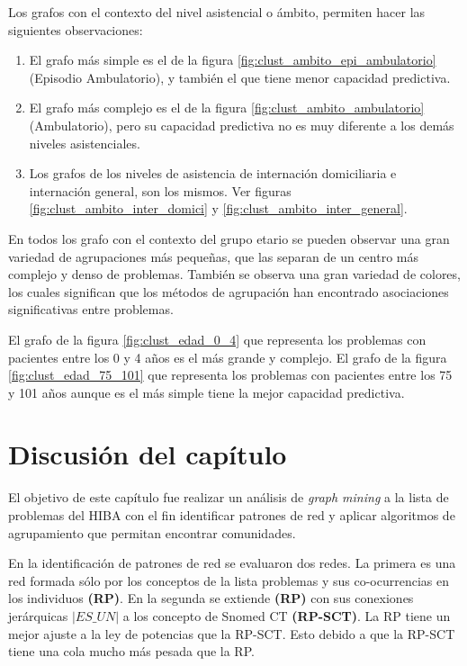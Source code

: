 Los grafos con el contexto del nivel asistencial o ámbito, permiten hacer las siguientes observaciones:

\begin{enumerate}
\item El grafo más simple es el de la figura \ref{fig:clust_ambito_epi_ambulatorio} (Episodio Ambulatorio), y también el que tiene menor capacidad predictiva.
\item El grafo más complejo es el de la figura \ref{fig:clust_ambito_ambulatorio} (Ambulatorio), pero su capacidad predictiva no es muy diferente a los demás niveles asistenciales.
\item Los grafos de los niveles de asistencia de internación domiciliaria e internación general, son los mismos. Ver figuras \ref{fig:clust_ambito_inter_domici}  y \ref{fig:clust_ambito_inter_general}.

\end{enumerate}
En todos los grafo con el contexto del grupo etario se pueden observar una gran variedad de agrupaciones más pequeñas, que las separan de un centro más complejo y denso de problemas. También se observa una gran variedad de colores, los cuales significan que los métodos de agrupación han encontrado asociaciones significativas entre problemas.

El grafo de la figura \ref{fig:clust_edad_0_4} que representa los problemas con pacientes entre los 0 y 4 años es el más grande y complejo. El grafo de la figura \ref{fig:clust_edad_75_101} que representa los problemas con pacientes entre los 75 y 101 años aunque es el más simple tiene la mejor capacidad predictiva.

\section{Discusión del capítulo}
El objetivo de este capítulo fue realizar un análisis de \textit{graph mining} a la lista de problemas del HIBA con el fin identificar patrones de red y aplicar algoritmos de agrupamiento que permitan encontrar comunidades.

En la identificación de patrones de red se evaluaron dos redes. La primera es una red formada sólo por los conceptos de la lista problemas y sus co-ocurrencias en los individuos \textbf{(\acrshort{RP})}. En la segunda se extiende \textbf{(\acrshort{RP})} con sus conexiones jerárquicas $|\textit{ES\_UN}|$ a los concepto de Snomed CT \textbf{(\acrshort{RP-SCT})}. La \acrshort{RP} tiene un mejor ajuste a la ley de potencias que la \acrshort{RP-SCT}. Esto debido a que la \acrshort{RP-SCT} tiene una cola mucho más pesada que la \acrshort{RP}. 

